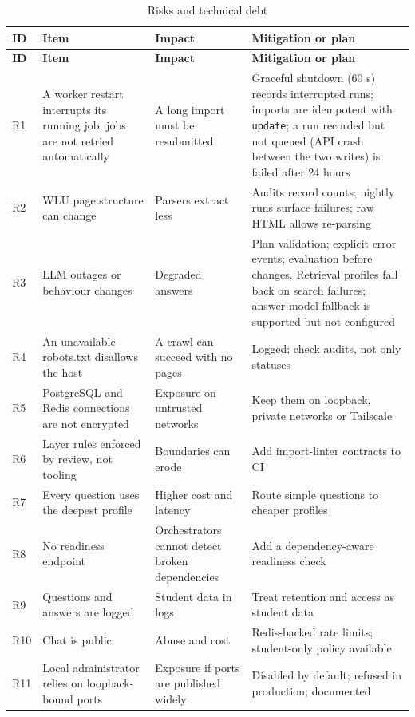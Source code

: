 \documentclass[11pt,letterpaper]{report}
\begin{document}
\begin{longtable}{@{}P{0.9cm}P{5.0cm}P{3.6cm}P{5.9cm}@{}}
\caption{Risks and technical debt}\label{tab:risks}\\
\toprule
\textbf{ID} & \textbf{Item} & \textbf{Impact} & \textbf{Mitigation or plan} \\
\midrule
\endfirsthead
\toprule
\textbf{ID} & \textbf{Item} & \textbf{Impact} & \textbf{Mitigation or plan} \\
\midrule
\endhead
R1 & A worker restart interrupts its running job; jobs are not retried automatically & A long import must be resubmitted & Graceful shutdown (60 s) records interrupted runs; imports are idempotent with \texttt{update}; a run recorded but not queued (API crash between the two writes) is failed after 24 hours \\
R2 & WLU page structure can change & Parsers extract less & Audits record counts; nightly runs surface failures; raw HTML allows re-parsing \\
R3 & LLM outages or behaviour changes & Degraded answers & Plan validation; explicit error events; evaluation before changes. Retrieval profiles fall back on search failures; answer-model fallback is supported but not configured \\
R4 & An unavailable robots.txt disallows the host & A crawl can succeed with no pages & Logged; check audits, not only statuses \\
R5 & PostgreSQL and Redis connections are not encrypted & Exposure on untrusted networks & Keep them on loopback, private networks or Tailscale \\
R6 & Layer rules enforced by review, not tooling & Boundaries can erode & Add import-linter contracts to CI \\
R7 & Every question uses the deepest profile & Higher cost and latency & Route simple questions to cheaper profiles \\
R8 & No readiness endpoint & Orchestrators cannot detect broken dependencies & Add a dependency-aware readiness check \\
R9 & Questions and answers are logged & Student data in logs & Treat retention and access as student data \\
R10 & Chat is public & Abuse and cost & Redis-backed rate limits; student-only policy available \\
R11 & Local administrator relies on loopback-bound ports & Exposure if ports are published widely & Disabled by default; refused in production; documented \\

\end{longtable}
\end{document}
